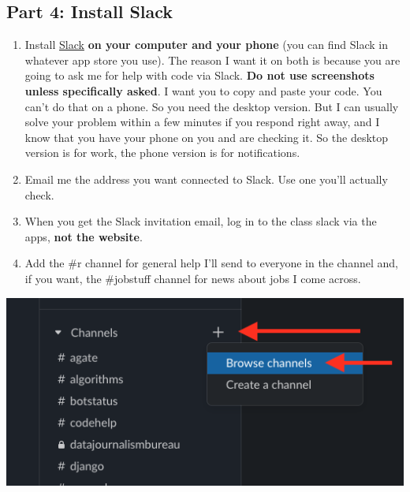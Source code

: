 \documentclass[
  letterpaper,
  DIV=11,
  numbers=noendperiod]{scrreprt}
\providecommand{\tightlist}{%
  \setlength{\itemsep}{0pt}\setlength{\parskip}{0pt}}\usepackage{longtable,booktabs,array}
\begin{document}
\hypertarget{part-4-install-slack}{%
\subsection{Part 4: Install Slack}\label{part-4-install-slack}}

\begin{enumerate}
\def\labelenumi{\arabic{enumi}.}
\tightlist
\item
  Install \href{https://slack.com/get}{Slack} \textbf{on your computer
  and your phone} (you can find Slack in whatever app store you use).
  The reason I want it on both is because you are going to ask me for
  help with code via Slack. \textbf{Do not use screenshots unless
  specifically asked}. I want you to copy and paste your code. You can't
  do that on a phone. So you need the desktop version. But I can usually
  solve your problem within a few minutes if you respond right away, and
  I know that you have your phone on you and are checking it. So the
  desktop version is for work, the phone version is for notifications.
\item
  Email me the address you want connected to Slack. Use one you'll
  actually check.
\item
  When you get the Slack invitation email, log in to the class slack via
  the apps, \textbf{not the website}.
\item
  Add the \#r channel for general help I'll send to everyone in the
  channel and, if you want, the \#jobstuff channel for news about jobs I
  come across.
\end{enumerate}

\includegraphics{./images/Screen Shot 2020-07-30 at 7.06.05 PM.png}
\end{document}
